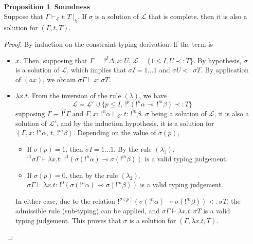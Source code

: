 \documentclass[10pt]{article}
\theoremstyle{plain}
\theoremstyle{definition}
\newtheorem{prop}{Proposition}[section]
\begin{document}
\begin{prop}{\bf Soundness} \\
	Suppose that $\Gamma \vdash_\mathcal{L} t : T ~|_\chi$. If $\sigma$ is a solution
	of $\mathcal{L}$ that is complete, then it is also a solution for $(\Gamma, t, T)$.

	\begin{proof}
 		By induction on the constraint typing derivation. If the term is
 		\begin{itemize}
 		\item $x$. Then, supposing that $\Gamma = \,!^I\Delta, x : U$, $\mathcal{L} = \{ 1 \le I, U \prec: T \}$. By hypothesis, $\sigma$ is a solution
 			of $\mathcal{L}$, which implies that $\sigma I = 1 \dots 1$ and $\sigma U <: \sigma T$.
 			By application of $(ax)$, we obtain $\sigma \Gamma \vdash x : \sigma T$.
 			
 		\item $\lambda x.t$. From the inversion of the rule $(\lambda)$, we have
		 		$$\mathcal{L} = \mathcal{L'} \cup \{p \le I, ~!^p(!^n\alpha \multimap \,!^m\beta) \prec: T\}$$
		 	supposing $\Gamma \equiv \,!^I \Gamma$ and $\Gamma, x : \,!^n\alpha \vdash_\mathcal{L'} t : \,!^m\beta$.
		 	$\sigma$ being a solution of $\mathcal{L}$, it is also a solution of $\mathcal{L'}$, and
		 	by the induction hypothesis, it is a solution for $(\Gamma, x : \,!^n\alpha, \,t, \,!^m\beta)$. Depending on the value
		 	of $\sigma (p)$,
		 	\begin{itemize}
		 		\item If $\sigma(p) = 1$, then $\sigma I = 1 \dots 1$. By the rule $(\lambda_1)$,
		 			$!^1\sigma\Gamma \vdash \lambda x.t : \,!^1(\sigma(!^n \alpha) \multimap \sigma(!^m \beta))$ is a valid typing judgement.
		 			
		 		\item If $\sigma(p) = 0$, then by the rule $(\lambda_2)$,
		 			$\sigma\Gamma \vdash \lambda x.t : \,!^0(\sigma(!^n \alpha) \multimap \sigma(!^m \beta))$ is a valid typing judgement.
		 	\end{itemize}
			In either case, due to the relation $!^{\sigma(p)} (\sigma(!^n\alpha) \multimap \sigma(!^m\beta)) <: \sigma T$, the admissible rule
			(sub-typing) can be applied, and $\sigma \Gamma \vdash \lambda x . t : \sigma T$ is a valid typing judgement.
			This proves that $\sigma$ is a solution for $(\Gamma, \lambda x.t, T)$.
		

\end{itemize}
\end{proof}
\end{prop}
\end{document}
